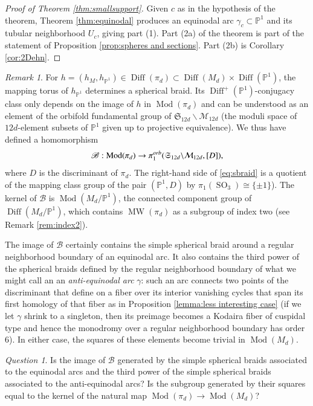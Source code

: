 \documentclass[10pt,letterpaper]{amsart}
\numberwithin{equation}{section}
\def\PP{{\mathbb P}}
\def\Pb{{\mathbb P}}
\def\g{\gamma}
\def\orb{{\rm orb}}
\def\bs{\backslash}
\def\Mcal{{\mathcal M}}
\def\Scal{{\mathfrak S}}
\def\Bscr{{\mathscr B}}
\newcommand\Diff{\operatorname{Diff}}
\newcommand\Mod{\operatorname{Mod}}
\newcommand\MW{\operatorname{MW}}
\newcommand\SO{\operatorname{SO}}
\theoremstyle{remark}
\newtheorem{remark}[theorem]{Remark}
\newtheorem{question}[theorem]{Question}
\begin{document}
\begin{proof}[Proof of Theorem \ref{thm:smallsupport}]
Given $c$ as in the hypothesis of the theorem, Theorem  
\ref{thm:equinodal} produces an equinodal arc $\gamma_c\subset\Pb^1$ and its tubular neighborhood $U_c$, giving part (1).   Part (2a) of the theorem 
is part of the statement of Proposition \ref{prop:spheres and sections}.  Part (2b) is  Corollary \ref{cor:2Dehn}.
\end{proof}


\begin{remark}\label{rem:}  For $h=(h_M,h_{\PP^1}) \in \Diff(\pi_d)\subset \Diff(M_d)\times \Diff(\PP^1)$,  the  mapping torus of $h_{\PP^1}$  determines a spherical braid. Its  
$\Diff^+(\PP^1)$-conjugacy class only depends on the image of $h$ in $\Mod(\pi_d)$ and can be understood as an element of the orbifold fundamental group of $\Scal_{12d}\bs\Mcal_{12d}$ (the moduli space of $12d$-element subsets of $\PP^1$ given up to projective equivalence). We thus have defined a homomorphism
\begin{equation}
\label{eq:sbraid}
\Bscr: \Mod(\pi_d)\to \pi_1^\orb(\Scal_{12d}\bs\Mcal_{12d},[D]), 
\end{equation}
where $D$ is the discriminant of $\pi_d$.  The right-hand side of \eqref{eq:sbraid} is a quotient of the mapping class group of the pair $(\PP^1,D)$ by  $\pi_1(\SO_3)\cong\{\pm1 \}$). The kernel of $\Bscr$ is $\Mod(M_d/\PP^1)$, the connected component group of 
$\Diff(M_d/\PP^1)$, which contains $\MW(\pi_d)$ as a subgroup 
of index two (see Remark \ref{rem:index2}). 

The image of $\Bscr$ 
certainly contains the simple spherical braid  around a regular neighborhood boundary of an equinodal arc.
It also contains the third power of the spherical braids defined by the regular neighborhood boundary of what we might 
call an an \emph{anti-equinodal arc} $\g$: such an arc connects two points of the discriminant that define on a fiber over its 
interior vanishing cycles that span its first homology of that fiber as in Proposition  \ref{lemma:less interesting case} (if we let $\g$ shrink to a singleton, then its preimage becomes a Kodaira fiber of cuspidal type and hence the monodromy over a regular  neighborhood boundary has order $6$). In either case, the squares of these elements become trivial in $\Mod(M_d)$.
\end{remark}

\begin{question}\label{quest:}
Is the image of $\Bscr$ generated  by  the simple spherical braids associated to the equinodal arcs and the third  power  of the simple spherical braids associated to the anti-equinodal arcs? Is the subgroup generated by their squares equal to the kernel of the natural map $\Mod(\pi_d)\to \Mod (M_d)$? 
\end{question}
\end{document}
